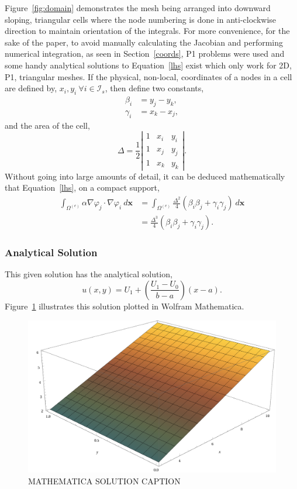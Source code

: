 Figure~\ref{fig:domain} demonstrates the mesh being arranged into downward sloping, triangular cells where the node numbering is done in anti-clockwise direction to maintain orientation of the integrals. For more convenience, for the sake of the paper, to avoid manually calculating the Jacobian and performing numerical integration, as seen in Section~\ref{coords}, P1 problems were used and some handy analytical solutions to Equation~\eqref{lhs} exist which only work for 2D, P1, triangular meshes. If the physical, non-local, coordinates of a nodes in a cell are defined by, $x_i, y_i~\forall i \in \mathcal{I}_s$, then define two constants,
\begin{align}
	\beta_i &= y_j - y_k,\\
	\gamma_i &= x_k - x_j,
\end{align} 
and the area of the cell,
\begin{equation}
	\Delta = \frac{1}{2}\left\vert
	\begin{matrix}
		1 & x_i & y_i \\
		1 & x_j & y_j \\
		1 & x_k & y_k
	\end{matrix}\right\vert.
\end{equation}
Without going into large amounts of detail, it can be deduced mathematically that Equation~\eqref{lhs}, on a compact support,
\begin{align}
	\int_{\Omega^{(e)}} \alpha \nabla \varphi_j \cdot \nabla \varphi_i~d\mathbf{x} &= \int_{\Omega^{(e)}}\frac{\Delta^2}{4}(\beta_i\beta_j + \gamma_i\gamma_j)~d\mathbf{x}\\
	&= \frac{\Delta^3}{4}(\beta_i\beta_j + \gamma_i\gamma_j).\label{conv}
\end{align}

\subsubsection{Analytical Solution}

This given solution has the analytical solution,
\begin{equation}
	u(x,y) = U_1 + \left(\frac{U_1 - U_0}{b - a}\right) (x - a).
\end{equation}
Figure~\ref{fig:soln} illustrates this solution plotted in Wolfram Mathematica.
\begin{figure}
	\centering
	\includegraphics[width=0.6\linewidth]{Figures/soln}
	\caption{MATHEMATICA SOLUTION CAPTION}
	\label{fig:soln}
\end{figure}

